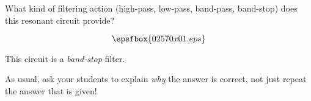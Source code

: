

What kind of filtering action (high-pass, low-pass, band-pass, band-stop) does this resonant circuit provide?

$$\epsfbox{02570x01.eps}$$







This circuit is a {\it band-stop} filter.







As usual, ask your students to explain {\it why} the answer is correct, not just repeat the answer that is given!




